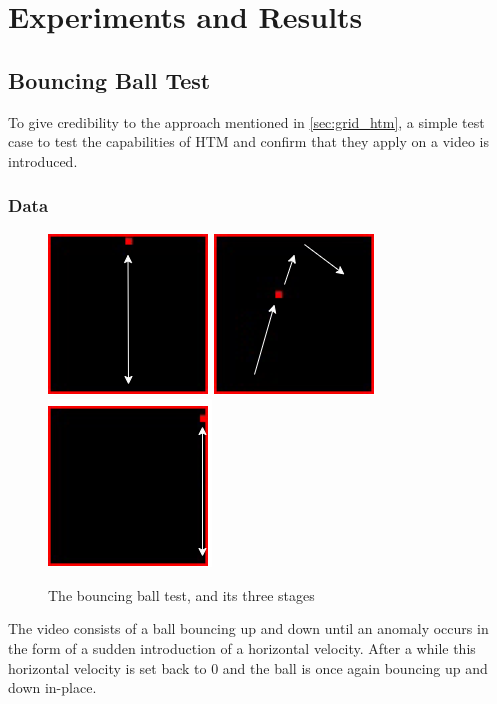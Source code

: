 \chapter{Experiments and Results}
\label{sec:experiments}
\section{Bouncing Ball Test}
To give credibility to the approach mentioned in \autoref{sec:grid_htm}, a simple test case to test the capabilities of HTM and confirm that they apply on a video is introduced.
\subsection{Data}
\begin{figure}[H]
    \centering
    \includegraphics[width=.3\textwidth]{resources/experiments/bouncing_ball/bb_updown1.png}\hfill
    \includegraphics[width=.3\textwidth]{resources/experiments/bouncing_ball/bb_updownside.png}\hfill
    \includegraphics[width=.3\textwidth]{resources/experiments/bouncing_ball/bb_updown2.png}
    \caption{The bouncing ball test, and its three stages}
    \label{fig:bb}
\end{figure}
The video consists of a ball bouncing up and down until an anomaly occurs in the form of a sudden introduction of a horizontal velocity. After a while this horizontal velocity is set back to 0 and the ball is once again bouncing up and down in-place.
\par
